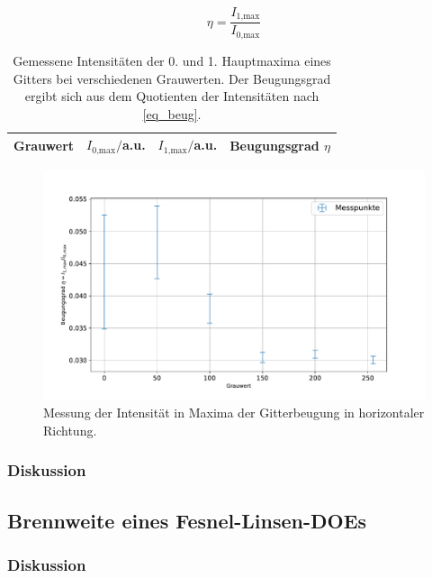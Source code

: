 \documentclass[
	a4paper,
	12pt,
	pagesize,
	ngerman
]{scrartcl}
\begin{document}

		\begin{equation}
			\label{eq_beug}
			\eta = \frac{I_\text{1,max}}{I_\text{0,max}}
		\end{equation}
\begin{table}[H]
		\centering
		\begin{tabular}{ c | c | c | c }
			 Grauwert & $I_\text{0,max}/$a.u. &$I_\text{1,max}/$a.u.&  Beugungsgrad $\eta$ \\ \hline
			 
		\end{tabular}
		\caption{
		Gemessene Intensitäten der 0. und 1. Hauptmaxima eines Gitters bei verschiedenen Grauwerten.
		Der Beugungsgrad ergibt sich aus dem Quotienten der Intensitäten nach \cref{eq_beug}.
		}
		\label{tb_beug}
\end{table}
\begin{figure}[H]
			\includegraphics[width=0.8\linewidth]{img/beugungsgrad}
			\caption{
			Messung der Intensität in Maxima der Gitterbeugung in horizontaler Richtung.
			}
			\label{fig_beug}
	\end{figure}
			\subsubsection*{Diskussion}

		\subsection{Brennweite eines Fesnel-Linsen-DOEs}

			\subsubsection*{Diskussion}
\end{document}
